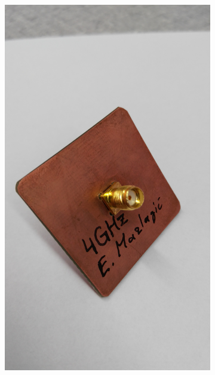 \begin{figure}[h!]
\begin{subfigure}[b]{0.22\textwidth}
		\includegraphics[width=1\textwidth]{../fig/pic/monopol_model_3.jpg}
	\end{subfigure}
	\begin{subfigure}[b]{0.22\textwidth}

\end{subfigure}
\end{figure}

